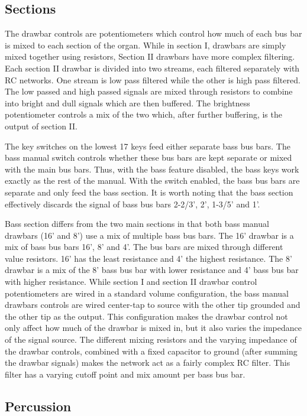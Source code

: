 \documentclass[11pt,a4paper]{article}
\begin{document}
\subsection{Sections}
\label{section:sections}

The drawbar controls are potentiometers which control how much of each bus bar is mixed to each section of the organ. While in section I, drawbars are simply mixed together using resistors, Section II drawbars have more complex filtering. Each section II drawbar is divided into two streams, each filtered separately with RC networks. One stream is low pass filtered while the other is high pass filtered. The low passed and high passed signals are mixed through resistors to combine into bright and dull signals which are then buffered. The brightness potentiometer controls a mix of the two which, after further buffering, is the output of section II. 

The key switches on the lowest 17 keys feed either separate bass bus bars. The bass manual switch controls whether these bus bars are kept separate or mixed with the main bus bars. Thus, with the bass feature disabled, the bass keys work exactly as the rest of the manual. With the switch enabled, the bass bus bars are separate and only feed the bass section. It is worth noting that the bass section effectively discards the signal of bass bus bars 2-2/3', 2', 1-3/5' and 1'.

Bass section differs from the two main sections in that both bass manual drawbars (16' and 8') use a mix of multiple bass bus bars. The 16' drawbar is a mix of bass bus bars 16', 8' and 4'. The bus bars are mixed through different value resistors. 16' has the least resistance and 4' the highest resistance. The 8' drawbar is a mix of the 8' bass bus bar with lower resistance and 4' bass bus bar with higher resistance. While section I and section II drawbar control potentiometers are wired in a standard volume configuration, the bass manual drawbars controls are wired center-tap to source with the other tip grounded and the other tip as the output. This configuration makes the drawbar control not only affect how much of the drawbar is mixed in, but it also varies the impedance of the signal source. The different mixing resistors and the varying impedance of the drawbar controls, combined with a fixed capacitor to ground (after summing the drawbar signals) makes the network act as a fairly complex RC filter. This filter has a varying cutoff point and mix amount per bass bus bar.

\subsection{Percussion}
\end{document}
